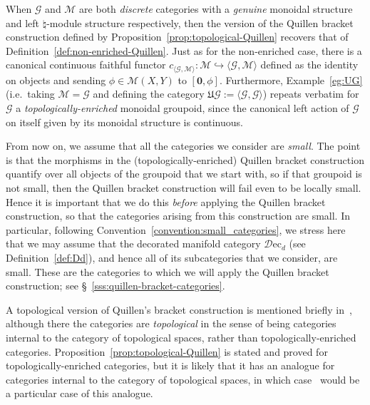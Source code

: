 \documentclass[AHL,Unicode,published]{cedram}
\newcommand{\rec}{\mathrm{ec}}
\newcommand{\zero}{\mathbf{0}}
\newcommand{\fU}{\ensuremath{\mathfrak{U}}}
\newcommand{\cD}{\mathcal{D}}
\newcommand{\cG}{\mathcal{G}}
\newcommand{\cM}{\mathcal{M}}
\begin{document}
When $\cG$ and $\cM$ are both \emph{discrete} categories with a \emph{genuine} monoidal structure and left $\natural$-module structure respectively, then the version of the Quillen bracket construction defined by Proposition~\ref{prop:topological-Quillen} recovers that of Definition~\ref{def:non-enriched-Quillen}. Just as for the non-enriched case, there is a canonical continuous faithful functor $c_{\langle \cG,\cM\rangle }\colon\cM\hookrightarrow\langle \cG,\cM\rangle$ defined as the identity on objects and sending $\phi\in \cM(X,Y)$ to $[\zero,\phi]$. Furthermore, Example~\ref{eg:UG} (i.e.~taking $\cM = \cG$ and defining the category $\fU\cG:=\langle \cG,\cG \rangle$) repeats verbatim for $\cG$ a \emph{topologically-enriched} monoidal groupoid, since the canonical left action of $\cG$ on itself given by its monoidal structure is continuous.

\begin{rema}\label{rmk:small_categories_Quillen}
From now on, we assume that all the categories we consider are \emph{small}. The point is that the morphisms in the (topologically-enriched) Quillen bracket construction quantify over all objects of the groupoid that we start with, so if that groupoid is not small, then the Quillen bracket construction will fail even to be locally small. Hence it is important that we do this \emph{before} applying the Quillen bracket construction, so that the categories arising from this construction are small. In particular, following Convention~\ref{convention:small_categories}, we stress here that we may assume that the decorated manifold category $\cD\rec_d$ (see Definition~\ref{def:Dd}), and hence all of its subcategories that we consider, are small. These are the categories to which we will apply the Quillen bracket construction; see \S~\ref{sss:quillen-bracket-categories}.
\end{rema}

\begin{rema}
A topological version of Quillen's bracket construction is mentioned briefly in~\cite[Rem.~2.10]{Krannich2017Homologicalstabilitytopological}, although there the categories are \emph{topological} in the sense of being categories internal to the category of topological spaces, rather than topologically-enriched categories. Proposition~\ref{prop:topological-Quillen} is stated and proved for topologically-enriched categories, but it is likely that it has an analogue for categories internal to the category of topological spaces, in which case~\cite[Lem.~2.10]{Krannich2017Homologicalstabilitytopological} would be a particular case of this analogue.
\end{rema}
\end{document}

